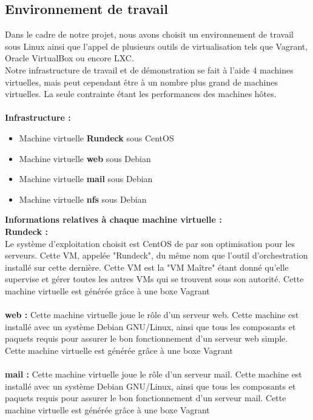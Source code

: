\documentclass[12pt]{article}
\begin{document}
\subsection{Environnement de travail}
Dans le cadre de notre projet, nous avons choisit un environnement de travail sous Linux ainsi que l'appel de plusieurs outils de virtualisation tels que Vagrant, Oracle VirtualBox ou encore LXC.
\\
Notre infrastructure de travail et de démonstration se fait à l'aide 4 machines virtuelles, mais peut cependant être à un nombre plus grand de machines virtuelles. La seule contrainte étant les performances des machines hôtes.
\\
\vspace{0.5cm}
\\
\textbf{Infrastructure :}
\begin{itemize}
    \item Machine virtuelle \textbf{Rundeck} sous CentOS
    \item Machine virtuelle \textbf{web} sous Debian
    \item Machine virtuelle \textbf{mail} sous Debian
    \item Machine virtuelle \textbf{nfs} sous Debian
\end{itemize}
\vspace{0.5cm}
\textbf{Informations relatives à chaque machine virtuelle :}
\vspace{0.5cm}
\\
\textbf{Rundeck :} 
\\
Le système d'exploitation choisit est CentOS de par son optimisation pour les serveurs. Cette VM, appelée "Rundeck", du même nom que l'outil d'orchestration installé sur cette dernière. Cette VM est la "VM Maître" étant donné qu'elle supervise et gérer toutes les autres VMs qui se trouvent sous son autorité. Cette machine virtuelle est générée grâce à une boxe Vagrant 
\\
\vspace{0.5cm}
\\
\textbf{web :}
Cette machine virtuelle joue le rôle d'un serveur web. Cette machine est installé avec un système Debian GNU/Linux, ainsi que tous les composants et paquets requis pour assurer le bon fonctionnement d'un serveur web simple. Cette machine virtuelle est générée grâce à une boxe Vagrant 
\\
\vspace{0.5cm}
\\
\textbf{mail :}
Cette machine virtuelle joue le rôle d'un serveur mail. Cette machine est installé avec un système Debian GNU/Linux, ainsi que tous les composants et paquets requis pour assurer le bon fonctionnement d'un serveur mail. Cette machine virtuelle est générée grâce à une boxe Vagrant 
\end{document}
